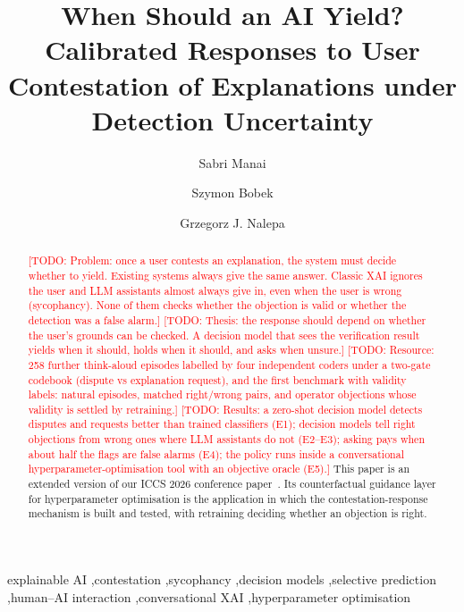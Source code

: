 \documentclass[preprint,12pt,3p,times]{elsarticle}
\newcommand{\todo}[1]{\textcolor{red}{[TODO: #1]}}
\begin{document}
\begin{frontmatter}

\title{When Should an AI Yield? Calibrated Responses to User Contestation of Explanations under Detection Uncertainty}

\author[uj]{Sabri Manai}
\author[uj]{Szymon Bobek}
\author[uj]{Grzegorz J. Nalepa}
\address[uj]{Jagiellonian University, Krak{\'o}w, Poland}

\begin{abstract}
\todo{Problem: once a user contests an explanation, the system must decide whether to yield. Existing systems always give the same answer. Classic XAI ignores the user and LLM assistants almost always give in, even when the user is wrong (sycophancy). None of them checks whether the objection is valid or whether the detection was a false alarm.}
\todo{Thesis: the response should depend on whether the user's grounds can be checked. A decision model that sees the verification result yields when it should, holds when it should, and asks when unsure.}
\todo{Resource: 258 further think-aloud episodes labelled by four independent coders under a two-gate codebook (dispute vs explanation request), and the first benchmark with validity labels: natural episodes, matched right/wrong pairs, and operator objections whose validity is settled by retraining.}
\todo{Results: a zero-shot decision model detects disputes and requests better than trained classifiers (E1); decision models tell right objections from wrong ones where LLM assistants do not (E2--E3); asking pays when about half the flags are false alarms (E4); the policy runs inside a conversational hyperparameter-optimisation tool with an objective oracle (E5).}
This paper is an extended version of our ICCS 2026 conference paper~\cite{manai2026orders}. Its counterfactual guidance layer for hyperparameter optimisation is the application in which the contestation-response mechanism is built and tested, with retraining deciding whether an objection is right.
\end{abstract}

\begin{keyword}
explainable AI \sep contestation \sep sycophancy \sep decision models \sep selective prediction \sep human--AI interaction \sep conversational XAI \sep hyperparameter optimisation
\end{keyword}

\end{frontmatter}
\end{document}
